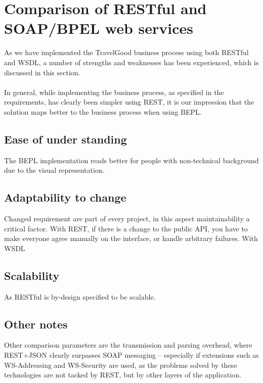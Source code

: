 {\setlength{\chapterfontsize}{26pt}
\chapter{Comparison of RESTful and SOAP/BPEL web services}
}
As we have implemented the TravelGood business process using both RESTful and WSDL, a number of strengths and weaknesses has been experienced, which is discussed in this section.\\\\
In general, while implementing the business process, as specified in the requirements, has clearly been simpler using REST, it is our impression that the solution maps better to the business process when using BEPL.

\section{Ease of under standing}
The BEPL implementation reads better for people with non-technical background due to the visual representation.

\section{Adaptability to change}
Changed requirement are part of every project, in this aspect maintainability a critical factor. With REST, if there is a change to the public API, you have to make everyone agree manually on the interface, or handle arbitrary failures. With WSDL

\section{Scalability}
As RESTful is by-design specified to be scalable.

\section{Other notes}
Other comparison parameters are the transmission and parsing overhead, where REST+JSON clearly surpasses SOAP messaging -- especially if extensions such as WS-Addressing and WS-Security are used, as the problems solved by these technologies are not tacked by REST, but by other layers of the application.
